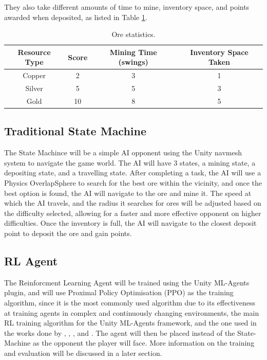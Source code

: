 \begin{spacing}{2.0}
	They also take different amounts of time to mine, inventory space, and points awarded when deposited, as listed in Table \ref{ore_table}.

	\begin{table}[ht]
		\centering
		\renewcommand{\arraystretch}{1.2} %
		\setlength{\tabcolsep}{8pt} %
		\begin{tabular}{|c|c|c|c|}
			\hline
			\textbf{Resource Type} & \textbf{Score} & \textbf{Mining Time (swings)} & \textbf{Inventory Space Taken} \\
			\hline
			Copper                 & 2              & 3                             & 1                              \\
			\hline
			Silver                 & 5              & 5                             & 3                              \\
			\hline
			Gold                   & 10             & 8                             & 5                              \\
			\hline
		\end{tabular}
		\caption{Ore statistics.}
		\label{ore_table}
	\end{table}

	\subsection{Traditional State Machine}

	The State Machince will be a simple AI opponent using the Unity navmesh system to navigate the game world. The AI will have 3 states, a mining state, a depositing state, and a travelling state.
	After completing a task, the AI will use a Physics OverlapSphere to search for the best ore within the vicinity, and once the best option is found, the AI will navigate to the ore and mine it.
	The speed at which the AI travels, and the radius it searches for ores will be adjusted based on the difficulty selected, allowing for a faster and more effective opponent on higher difficulties.
	Once the inventory is full, the AI will navigate to the closest deposit point to deposit the ore and gain points.

	\subsection{RL Agent}

	The Reinforcment Learning Agent will be trained using the Unity ML-Agents plugin, and will use Proximal Policy Optimisation (PPO) as the training algorithm, since it is the most commonly used algorithm due to
	its effectiveness at training agents in complex and continuously changing environments, the main RL training algorithm for the Unity ML-Agents framework, and the one used in the works done by \cite{grech_creating_2023},
    \cite{bin_ramlan_implementation_2021}, \cite{berta_development_2024}, and \cite{raut_unity_2024}.
	The agent will then be placed instead of the State-Machine as the opponent the player will face. More information on the training and evaluation will be discussed in a later section.


\end{spacing}
